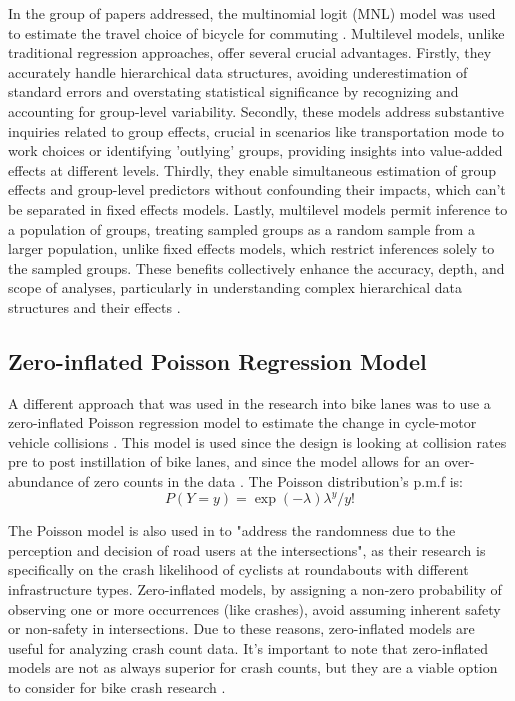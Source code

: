 \documentclass[12pt, letterpaper]{article}
\begin{document}
In the group of papers addressed, the multinomial logit (MNL) model was used to estimate the travel choice of bicycle for commuting \cite{10Zhao2013}. Multilevel models, unlike traditional regression approaches, offer several crucial advantages. Firstly, they accurately handle hierarchical data structures, avoiding underestimation of standard errors and overstating statistical significance by recognizing and accounting for group-level variability. Secondly, these models address substantive inquiries related to group effects, crucial in scenarios like transportation mode to work choices or identifying 'outlying' groups, providing insights into value-added effects at different levels. Thirdly, they enable simultaneous estimation of group effects and group-level predictors without confounding their impacts, which can't be separated in fixed effects models. Lastly, multilevel models permit inference to a population of groups, treating sampled groups as a random sample from a larger population, unlike fixed effects models, which restrict inferences solely to the sampled groups. These benefits collectively enhance the accuracy, depth, and scope of analyses, particularly in understanding complex hierarchical data structures and their effects \cite{Rasbash_2023}.

\subsection{Zero-inflated Poisson Regression Model}
\label{sec:pois}

A different approach that was used in the research into bike lanes was to use a zero-inflated Poisson regression model to estimate the change in cycle-motor vehicle collisions \cite{8Bhatia2016}. This model is used since the design is looking at collision rates pre to post instillation of bike lanes, and since the model allows for an over-abundance of zero counts in the data \cite{Giles2010}. The Poisson distribution's p.m.f is:
\[P(Y=y) = \exp{(-\lambda)\lambda^{y}}/y!\]

The Poisson model is also used in \citet{9Cantisani2021} to "address the randomness due to the perception and decision of road users at the intersections", as their research is specifically on the crash likelihood of cyclists at roundabouts with different infrastructure types. Zero-inflated models, by assigning a non-zero probability of observing one or more occurrences (like crashes), avoid assuming inherent safety or non-safety in intersections. Due to these reasons, zero-inflated models are useful for analyzing crash count data. It's important to note that zero-inflated models are not as always superior for crash counts, but they are a viable option to consider for bike crash research \cite{Pew_Warr_Schultz_Heaton_2020}. 
\end{document}
